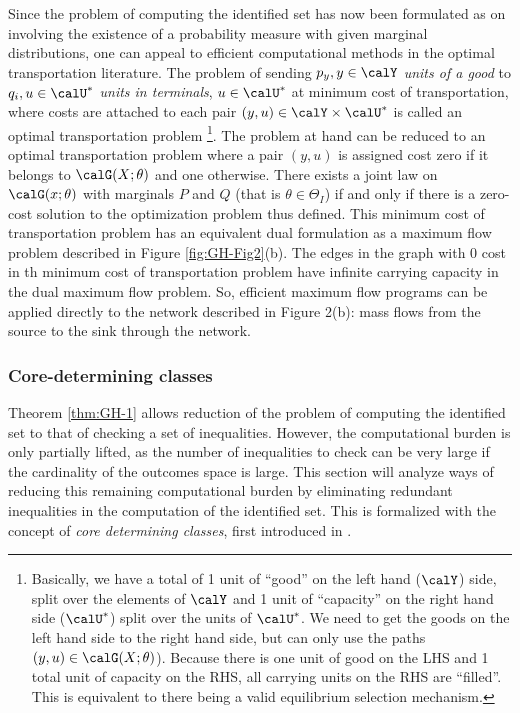 Since the problem of computing the identified set has now been formulated as on involving the existence of a probability measure with given marginal distributions, one can appeal to efficient computational methods in the optimal transportation literature. The problem of sending $p_y, y\in \calY$ \emph{units of a good} to $q_i, u\in\calU^*$ \emph{units in terminals}, $u\in \calU^*$ at minimum cost of transportation, where costs are attached to each pair $(y,u) \in \calY\times\calU^*$ is called an optimal transportation problem
\footnote{Basically, we have a total of 1 unit of ``good'' on the left hand ($\calY$) side, split over the elements of $\calY$ and 1 unit of ``capacity'' on the right hand side ($\calU^*$) split over the units of $\calU^*$. We need to get the goods on the left hand side to the right hand side, but can only use the paths $(y,u)\in\calG(X;\theta)$). Because there is one unit of good on the LHS and 1 total unit of capacity on the RHS, all carrying units on the RHS are ``filled''. This is equivalent to there being a valid equilibrium selection mechanism.}. The problem at hand can be reduced to an optimal transportation problem where a pair $(y,u)$ is assigned cost zero if it belongs to $\calG(X;\theta)$ and one otherwise. There exists a joint law on $\calG(x;\theta)$ with marginals $P$ and $Q$ (that is $\theta\in\Theta_I$) if and only if there is a zero-cost solution to the optimization problem thus defined. This minimum cost of transportation problem has an equivalent dual formulation as a maximum flow problem described in Figure \ref{fig:GH-Fig2}(b). The edges in the graph with 0 cost in th minimum cost of transportation problem have infinite carrying capacity in the dual maximum flow problem. So, efficient maximum flow programs can be applied directly to the network described in Figure 2(b): mass flows from the source to the sink through the network. 

\subsubsection{Core-determining classes}

Theorem \ref{thm:GH-1} allows reduction of the problem of computing the identified set to that of checking a set of inequalities. However, the computational burden is only partially lifted, as the number of inequalities to check can be very large if the cardinality of the outcomes space is large. This section will analyze ways of reducing this remaining computational burden by eliminating redundant inequalities in the computation of the identified set. This is formalized with the concept of \emph{core determining classes}, first introduced in \citet{GH-2006}.

